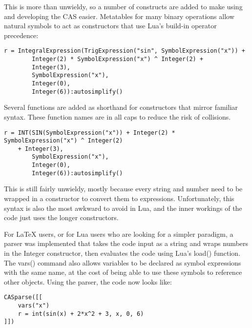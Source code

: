 \documentclass{article}
\begin{document}
This is more than unwieldy, so a number of constructs are added to make using and developing the CAS easier. Metatables for many binary operations allow natural symbols to act as constructors that use Lua's build-in operator precedence:

\begin{verbatim}
r = IntegralExpression(TrigExpression("sin", SymbolExpression("x")) +
        Integer(2) * SymbolExpression("x") ^ Integer(2) +
        Integer(3),
        SymbolExpression("x"),
        Integer(0),
        Integer(6)):autosimplify()
\end{verbatim}

Several functions are added as shorthand for constructors that mirror familiar syntax. These function names are in all caps to reduce the risk of collisions.

\begin{verbatim}
r = INT(SIN(SymbolExpression("x")) + Integer(2) * SymbolExpression("x") ^ Integer(2) 
    + Integer(3),
        SymbolExpression("x"),
        Integer(0),
        Integer(6)):autosimplify()
\end{verbatim}

This is still fairly unwieldy, mostly because every string and number need to be wrapped in a constructor to convert them to expressions. Unfortunately, this syntax is also the most awkward to avoid in Lua, and the inner workings of the code just uses the longer constructors.

For \LaTeX{} users, or for Lua users who are looking for a simpler paradigm, a parser was implemented that takes the code input as a string and wraps numbers in the {\ttfamily Integer} constructor, then evaluates the code using Lua's {\ttfamily load()} function. The {\ttfamily vars()} command also allows variables to be declared as symbol expressions with the same name, at the cost of being able to use these symbols to reference other objects. Using the parser, the code now looks like:

\begin{verbatim}
CASparse([[
    vars("x")
    r = int(sin(x) + 2*x^2 + 3, x, 0, 6)
]])
\end{verbatim}

\newpage

\printbibliography

\printindex
\end{document}

